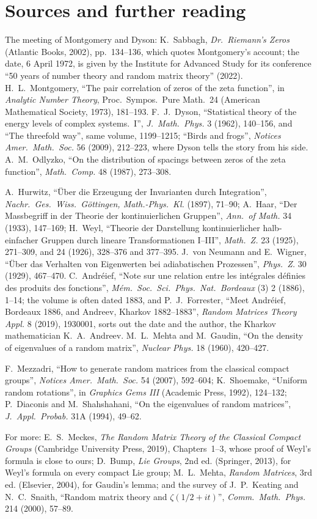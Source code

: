 \section*{Sources and further reading}

The meeting of Montgomery and Dyson: K.~Sabbagh, \emph{Dr.\ Riemann's Zeros} (Atlantic Books, 2002), pp.~134--136, which quotes Montgomery's account; the date, 6 April 1972, is
given by the Institute for Advanced Study for its conference ``50 years of number theory and random matrix theory'' (2022). H.~L.~Montgomery, ``The pair correlation of zeros of the zeta function'',
in \emph{Analytic Number Theory}, Proc.\ Sympos.\ Pure Math.\ 24 (American Mathematical Society, 1973), 181--193. F.~J.~Dyson, ``Statistical theory of the energy levels of complex systems.~I'',
\emph{J.\ Math.\ Phys.} 3 (1962), 140--156, and ``The threefold way'', same volume, 1199--1215; ``Birds and frogs'', \emph{Notices Amer.\ Math.\ Soc.} 56 (2009), 212--223, where Dyson tells the
story from his side. A.~M.~Odlyzko, ``On the distribution of spacings between zeros of the zeta function'', \emph{Math.\ Comp.} 48 (1987), 273--308.

A.~Hurwitz, ``\"Uber die Erzeugung der Invarianten durch Integration'', \emph{Nachr.\ Ges.\ Wiss.\ G\"ottingen, Math.-Phys.\ Kl.} (1897), 71--90; A.~Haar, ``Der Massbegriff in der Theorie der kontinuierlichen
Gruppen'', \emph{Ann.\ of Math.} 34 (1933), 147--169; H.~Weyl, ``Theorie der Darstellung kontinuierlicher halb-einfacher Gruppen durch lineare Transformationen I--III'', \emph{Math.\ Z.} 23 (1925), 271--309, and
24 (1926), 328--376 and 377--395. J.~von Neumann and E.~Wigner, ``\"Uber das Verhalten von Eigenwerten bei adiabatischen Prozessen'', \emph{Phys.\ Z.} 30 (1929), 467--470. C.~Andr\'eief, ``Note sur une relation
entre les int\'egrales d\'efinies des produits des fonctions'', \emph{M\'em.\ Soc.\ Sci.\ Phys.\ Nat.\ Bordeaux} (3) 2 (1886), 1--14; the volume is often dated 1883, and P.~J.~Forrester, ``Meet Andr\'eief, Bordeaux 1886, and Andreev, Kharkov 1882--1883'', \emph{Random Matrices Theory Appl.} 8 (2019), 1930001, sorts out the date and the author, the Kharkov mathematician K.~A.~Andreev. M.~L.~Mehta and M.~Gaudin, ``On the density of eigenvalues of a random matrix'', \emph{Nuclear Phys.} 18 (1960), 420--427.

F.~Mezzadri, ``How to generate random matrices from the classical compact groups'', \emph{Notices Amer.\ Math.\ Soc.} 54 (2007), 592--604; K.~Shoemake, ``Uniform random rotations'', in \emph{Graphics Gems III}
(Academic Press, 1992), 124--132; P.~Diaconis and M.~Shahshahani, ``On the eigenvalues of random matrices'', \emph{J.\ Appl.\ Probab.} 31A (1994), 49--62.

For more: E.~S.~Meckes, \emph{The Random Matrix Theory of the Classical Compact Groups} (Cambridge University Press, 2019), Chapters~1--3, whose proof of Weyl's formula is close to ours;
D.~Bump, \emph{Lie Groups}, 2nd ed. (Springer, 2013), for Weyl's formula on every compact Lie group; M.~L.~Mehta, \emph{Random Matrices}, 3rd ed. (Elsevier, 2004), for Gaudin's lemma; and the survey of
J.~P.~Keating and N.~C.~Snaith, ``Random matrix theory and $\zeta(1/2+it)$'', \emph{Comm.\ Math.\ Phys.} 214 (2000), 57--89.
